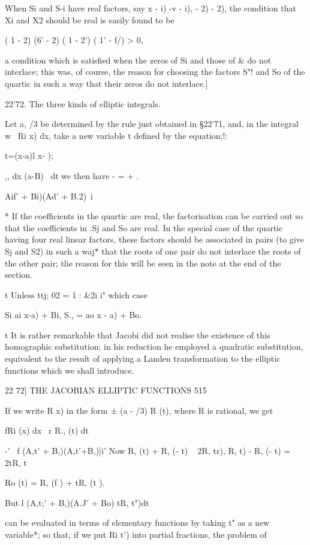 When Si and S-i have real factors, say x - i) -v - i), - 2) - 2), the
condition that Xi and X2 should be real is easily found to be

( 1 - 2) (6' - 2) ( 1 - 2') ( 1' - f/) > 0,

a condition which is satisfied when the zeros of Si and those of \& do
not interlace; this was, of course, the reason for choosing the
factors S"! and So of the quartic in such a way that their zeros do
not interlace.]

22'72. The three kinds of elliptic integrals.

Let a, /3 be determined by the rule just obtained in §22'71, and, in
the integral w~ Ri x) dx, take a new variable t defined by the
equation;!:

t=(x-a)l x- );

,, dx (a-B)~ dt we then have - = + .

    Aif' + Bi)(Ad' + B.2)\ i

* If the coefficients in the quartic are real, the factorisation can
be carried out so that the coefficients in .Sj and So are real. In the
special case of the quartic having four real linear factors, these
factors should be associated in pairs (to give Sj and S2) in such a
waj* that the roots of one pair do not interlace the roots of the
other pair; tlie reason for this will be seen in the note at the end
of the section.

t Unless ttj; 02 = 1 : \&2i i" which case

Si ai x-a) + Bi, S., = ao x - a) + Bo.

t It is rather remarkable that Jacobi did not realise the existence of
this homographic substitution; in his reduction he employed a
quadratic substitution, equivalent to the result of applying a Landen
transformation to the elliptic functions which we shall introduce.

22 72] THE JACOBIAN ELLIPTIC FUNCTIONS 515

If we write R x) in the form ± (a - /3) R (t), where R is rational, we
get

fRi (x) dx \ r R., (t) dt

-' ~f (A,t' + B,)(A,t'+B,)]i' Now R, (t) + R, (- t) ~ 2R, tr), R, t) -
R, (- t) = 2tR, t%

Ro (t) = R, (f ) + tR, (t ).

But l (A,t;' + B,)(A.J' + Bo) tR, t")dt

can be evaluated in terms of elementary functions by taking t" as a
new variable*; so that, if we put Ri t') into partial fractions, the
problem of


